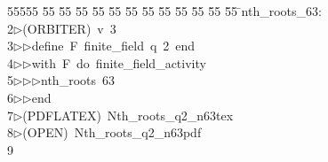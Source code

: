 %
%
\begin{tabbing}
55555 \= 55 \= 55 \= 55 \= 55 \= 55 \= 55 \= 55 \= 55 \= 55 \= 55 \= 55 \= 55 \= \>nth\_roots\_63:\\[0pt]
2\>$\triangleright$\>(ORBITER)\ v\ 3\ \\[0pt]
3\>$\triangleright$\>$\triangleright$\>define\ F\ finite\_field\ q\ 2\ end\ \\[0pt]
4\>$\triangleright$\>$\triangleright$\>with\ F\ do\ finite\_field\_activity\ \\[0pt]
5\>$\triangleright$\>$\triangleright$\>$\triangleright$\>nth\_roots\ 63\ \\[0pt]
6\>$\triangleright$\>$\triangleright$\>end\\[0pt]
7\>$\triangleright$\>(PDFLATEX)\ Nth\_roots\_q2\_n63tex\\[0pt]
8\>$\triangleright$\>(OPEN)\ Nth\_roots\_q2\_n63pdf\\[0pt]
9\>\end{tabbing}
